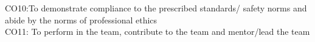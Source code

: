 \begin{titlepage}
CO10:To demonstrate compliance to the prescribed standards/ safety norms and abide by the norms of professional ethics\\
CO11: To perform in the team, contribute to the team and mentor/lead the team
\newpage
\begin{table}[ht]
\caption*{\textbf{CO-PO Mapping}}
\end{table}
\end{titlepage}
